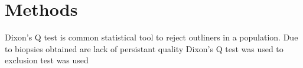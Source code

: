 \chapter{Methods}

Dixon's Q test is common statistical tool to reject outliners in a population. Due to  biopsies obtained are lack of persistant quality Dixon's Q test was used to   exclusion test was used 
